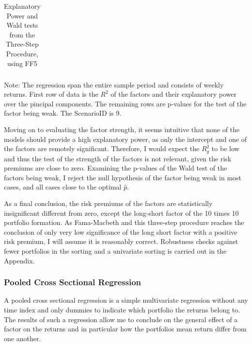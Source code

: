 \begin{table}[h]
	\centering
	
	\caption[Three-Step Procedure, Strength]{Explanatory Power and Wald tests from the Three-Step Procedure, using FF5}
	\label{tab:tp_strength_9}
	{\footnotesize
	\begin{tabular}{l|lllllllll}
		
	\end{tabular}
	}

	{\small Note: The regression span the entire sample period and consists of weekly returns. First row of data is the $R^{2}$ of the factors and their explanatory power over the pincipal components. The remaining rows are p-values for the test of the factor being weak. %
	The ScenarioID is 9.}
	
\end{table}

Moving on to evaluating the factor strength, it seems intuitive that none of the models should provide a high explanatory power, as only the intercept and one of the factors are remotely significant. Therefore, I would expect the $R^{2}_{g}$ to be low and thus the test of the strength of the factors is not relevant, given the risk premiums are close to zero. Examining the p-values of the Wald test of the factors being weak, I reject the null hypothesis of the factor being weak in most cases, and all cases close to the optimal $\hat{p}$.

As a final conclusion, the risk premiums of the factors are statistically insignificant different from zero, except the long-short factor of the 10 times 10 portfolio formation. As Fama-Macbeth and this three-step procedure reaches the conclusion of only very low significance of the long short factor with a positive risk premium, I will assume it is reasonably correct. Robustness checks against fewer portfolios in the sorting and a univariate sorting is carried out in the Appendix.

\subsubsection{Pooled Cross Sectional Regression}

A pooled cross sectional regression is a simple multivariate regression without any time index and only dummies to indicate which portfolio the returns belong to. The results of such a regression allow me to conclude on the general effect of a factor on the returns and in particular how the portfolios mean return differ from one another. 

